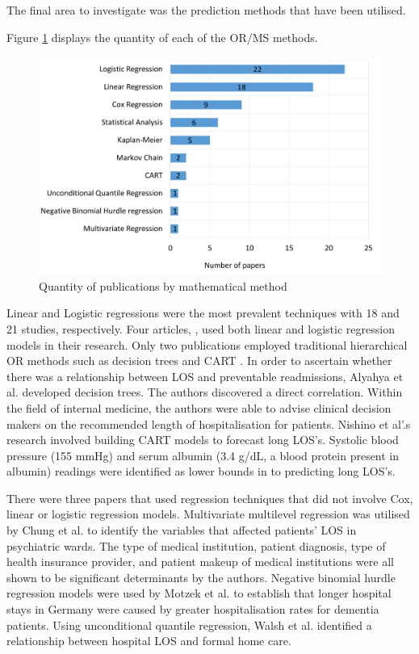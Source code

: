 \documentclass[../thesis.tex]{subfiles}
\begin{document}
The final area to investigate was the prediction methods that have been utilised. 

Figure \ref{fig:lr2method} displays the quantity of each of the OR/MS methods.

\begin{figure}[h!]
    \centering
    \includegraphics[scale=0.55]{Chapters/Chapter2/Figures2/method1.pdf}
    \caption{Quantity of publications by mathematical method}
    \label{fig:lr2method}
\end{figure}

Linear and Logistic regressions were the most prevalent techniques with 18 and 21 studies, respectively. Four articles, \cite{Adamis2017,Lisk2018,Motohashi2013,Naouri2022}, used both linear and logistic regression models in their research. Only two publications employed traditional hierarchical OR methods such as decision trees and CART \cite{Alyahya2017,Nishino2019}. In order to ascertain whether there was a relationship between LOS and preventable readmissions, Alyahya et al. \cite{Alyahya2017} developed decision trees. The authors discovered a direct correlation. Within the field of internal medicine, the authors were able to advise clinical decision makers on the recommended length of hospitalisation for patients. Nishino et al'.s \cite{Nishino2019} research involved building CART models to forecast long LOS's. Systolic blood pressure (155 mmHg) and serum albumin (3.4 g/dL, a blood protein present in albumin) readings were identified as lower bounds in to predicting long LOS's. 

There were three papers that used regression techniques that did not involve Cox, linear or logistic regression models. Multivariate multilevel regression was utilised by Chung et al. \cite{Chung2010} to identify the variables that affected patients' LOS in psychiatric wards. The type of medical institution, patient diagnosis, type of health insurance provider, and patient makeup of medical institutions were all shown to be significant determinants by the authors. Negative binomial hurdle regression models were used by Motzek et al. \cite{Motzek2018} to establish that longer hospital stays in Germany were caused by greater hospitalisation rates for dementia patients. Using unconditional quantile regression, Walsh et al. \cite{Walsh2020} identified a relationship between hospital LOS and formal home care.
\end{document}
